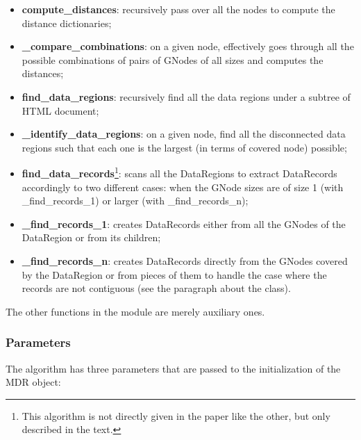 \documentclass[10pt]{article}
\begin{document}
\begin{itemize}
    
    \item \textbf{compute\_distances}: recursively pass over all the nodes to compute the distance dictionaries;
    
    \item \textbf{\_compare\_combinations}: on a given node, effectively goes through all the possible combinations of pairs of GNodes of all sizes and computes the distances;
    
    \item \textbf{find\_data\_regions}: recursively find all the data regions under a subtree of HTML document;
    
    \item \textbf{\_identify\_data\_regions}: on a given node, find all the disconnected data regions such that each one is the largest (in terms of covered node) possible; 
    
    \item \textbf{find\_data\_records}\footnote{This algorithm is not directly given in the paper like the other, but only described in the text.}: scans all the DataRegions to extract DataRecords accordingly to two different cases: when the GNode sizes are of size 1 (with \_find\_records\_1) or larger (with \_find\_records\_n);
    
    \item \textbf{\_find\_records\_1}: creates DataRecords either from all the GNodes of the DataRegion or from its children;
    
    \item \textbf{\_find\_records\_n}: creates DataRecords directly from the GNodes covered by the DataRegion or from pieces of them to handle the case where the records are not contiguous (see the paragraph about the  class).
    
\end{itemize}

The other functions in the module are merely auxiliary ones.



\subsubsection{Parameters}

The algorithm has three parameters that are passed to the initialization of the MDR object:
\end{document}
